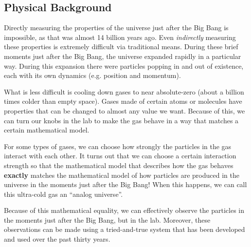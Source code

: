 \documentclass{article}
\begin{document}
        \subsection{Physical Background}

            Directly measuring the properties of the universe just after the Big Bang is impossible, as that was almost 14 billion years ago.  Even \emph{indirectly} measuring these properties is extremely difficult via traditional means.  During these brief moments just after the Big Bang, the universe expanded rapidly in a particular way.  During this expansion there were particles popping in and out of existence, each with its own dynamics (e.g. position and momentum).
    
            What is less difficult is cooling down gases to near absolute-zero (about a billion times colder than empty space).  Gases made of certain atoms or molecules have properties that can be changed to almost any value we want.  Because of this, we can turn our knobs in the lab to make the gas behave in a way that matches a certain mathematical model.
            
            For some types of gases, we can choose how strongly the particles in the gas interact with each other.  It turns out that we can choose a certain interaction strength so that the mathematical model that describes how the gas behaves \textbf{exactly} matches the mathematical model of how particles are produced in the universe in the moments just after the Big Bang!  When this happens, we can call this ultra-cold gas an ``analog universe''.

\pagebreak
    
            Because of this mathematical equality, we can effectively observe the particles in the moments just after the Big Bang, but in the lab. Moreover, these observations can be made using a tried-and-true system that has been developed and used over the past thirty years\cite{firstBEC}.
        
        
\end{document}
